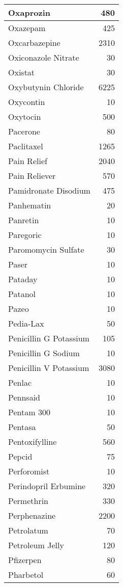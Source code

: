 \documentclass[
]{article}
\begin{document}
\begin{table}
\begin{tabular}[t]{l|r}
\hline
Oxaprozin & 480\\
\hline
Oxazepam & 425\\
\hline
Oxcarbazepine & 2310\\
\hline
Oxiconazole Nitrate & 30\\
\hline
Oxistat & 30\\
\hline
Oxybutynin Chloride & 6225\\
\hline
Oxycontin & 10\\
\hline
Oxytocin & 500\\
\hline
Pacerone & 80\\
\hline
Paclitaxel & 1265\\
\hline
Pain Relief & 2040\\
\hline
Pain Reliever & 570\\
\hline
Pamidronate Disodium & 475\\
\hline
Panhematin & 20\\
\hline
Panretin & 10\\
\hline
Paregoric & 10\\
\hline
Paromomycin Sulfate & 30\\
\hline
Paser & 10\\
\hline
Pataday & 10\\
\hline
Patanol & 10\\
\hline
Pazeo & 10\\
\hline
Pedia-Lax & 50\\
\hline
Penicillin G Potassium & 105\\
\hline
Penicillin G Sodium & 10\\
\hline
Penicillin V Potassium & 3080\\
\hline
Penlac & 10\\
\hline
Pennsaid & 10\\
\hline
Pentam 300 & 10\\
\hline
Pentasa & 50\\
\hline
Pentoxifylline & 560\\
\hline
Pepcid & 75\\
\hline
Perforomist & 10\\
\hline
Perindopril Erbumine & 320\\
\hline
Permethrin & 330\\
\hline
Perphenazine & 2200\\
\hline
Petrolatum & 70\\
\hline
Petroleum Jelly & 120\\
\hline
Pfizerpen & 80\\
\hline
Pharbetol & 60\\

\end{tabular}
\end{table}
\end{document}
